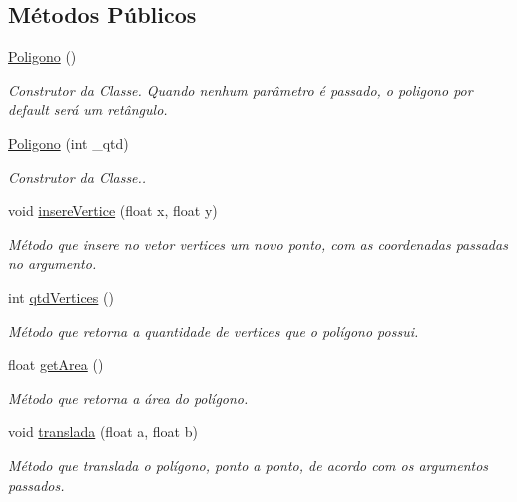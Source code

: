 \subsection*{Métodos Públicos}
\begin{DoxyCompactItemize}
\item 
\mbox{\label{classPoligono_a9311a9a1496878c09c8508b3636e2870}} 
\hyperlink{classPoligono_a9311a9a1496878c09c8508b3636e2870}{Poligono} ()
\begin{DoxyCompactList}\small\item\em Construtor da Classe. Quando nenhum parâmetro é passado, o poligono por default será um retângulo. \end{DoxyCompactList}\item 
\hyperlink{classPoligono_a9944b44a710f3fa23e90b5e2112923f9}{Poligono} (int \+\_\+qtd)
\begin{DoxyCompactList}\small\item\em Construtor da Classe.. \end{DoxyCompactList}\item 
void \hyperlink{classPoligono_aeaad76667207d96ea0d69c2dfb3bc2a9}{insere\+Vertice} (float x, float y)
\begin{DoxyCompactList}\small\item\em Método que insere no vetor \textquotesingle{}vertices\textquotesingle{} um novo ponto, com as coordenadas passadas no argumento. \end{DoxyCompactList}\item 
int \hyperlink{classPoligono_ae2c1c915b4a72104724d1302138e7caa}{qtd\+Vertices} ()
\begin{DoxyCompactList}\small\item\em Método que retorna a quantidade de vertices que o polígono possui. \end{DoxyCompactList}\item 
float \hyperlink{classPoligono_ab1a85a090e7442bf3151602b05da9e19}{get\+Area} ()
\begin{DoxyCompactList}\small\item\em Método que retorna a área do polígono. \end{DoxyCompactList}\item 
void \hyperlink{classPoligono_adbf605dfd0419b7301c9be0ec1dbe41b}{translada} (float a, float b)
\begin{DoxyCompactList}\small\item\em Método que translada o polígono, ponto a ponto, de acordo com os argumentos passados. \end{DoxyCompactList}\item 

\end{DoxyCompactItemize}
